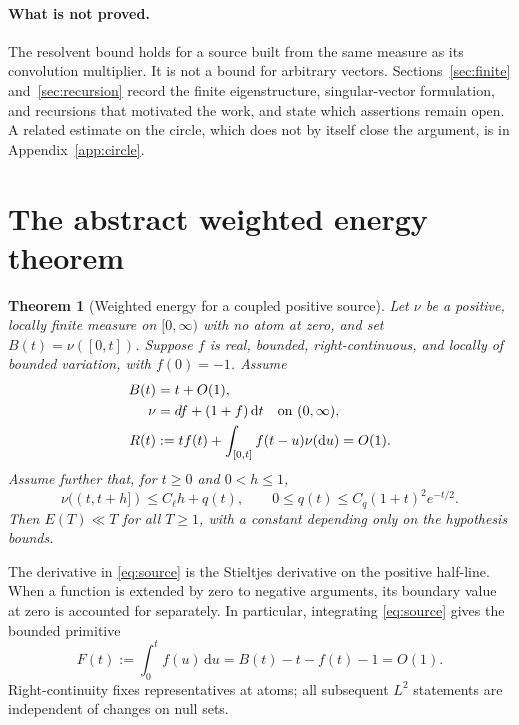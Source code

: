 \documentclass[11pt,letterpaper]{article}
\numberwithin{equation}{section}
\newtheorem{theorem}{Theorem}[section]
\theoremstyle{definition}
\theoremstyle{remark}
\newcommand{\dd}{\,\mathrm d}
\begin{document}
\paragraph{What is not proved.}
The resolvent bound holds for a source built from the same measure as its
convolution multiplier. It is not a bound for arbitrary vectors.
Sections~\ref{sec:finite} and~\ref{sec:recursion} record the finite
eigenstructure, singular-vector formulation, and recursions that motivated
the work, and state which assertions remain open. A related estimate on
the circle, which does not by itself close the argument, is in
Appendix~\ref{app:circle}.

\section{The abstract weighted energy theorem}\label{sec:abstract}

\begin{theorem}[Weighted energy for a coupled positive source]\label{thm:energy}
Let $\nu$ be a positive, locally finite measure on $[0,\infty)$ with no atom
at zero, and set $B(t)=\nu([0,t])$. Suppose $f$ is real, bounded,
right-continuous, and locally of bounded variation, with $f(0)=-1$. Assume
\begin{align}
 B(t)&=t+O(1),\label{eq:B}\\
 \nu&=df+(1+f)\dd t\quad\hbox{on }(0,\infty),\label{eq:source}\\
 R(t)&:=tf(t)+\int_{[0,t]}f(t-u)\nu(\mathrm du)=O(1).\label{eq:R}
\end{align}
Assume further that, for $t\ge0$ and $0<h\le1$,
\begin{equation}\label{eq:LD}
 \nu((t,t+h])\le C_\ell h+q(t),\qquad
 0\le q(t)\le C_q(1+t)^2e^{-t/2}.
\end{equation}
Then $E(T)\ll T$ for all $T\ge1$, with a constant depending only on the
hypothesis bounds.
\end{theorem}

The derivative in \eqref{eq:source} is the Stieltjes derivative on the positive
half-line. When a function is extended by zero to negative arguments, its
boundary value at zero is accounted for separately. In particular,
integrating \eqref{eq:source} gives the bounded primitive
\begin{equation}\label{eq:primitive}
 F(t):=\int_0^t f(u)\dd u=B(t)-t-f(t)-1=O(1).
\end{equation}
Right-continuity fixes representatives at atoms; all subsequent $L^2$
statements are independent of changes on null sets.
\end{document}

